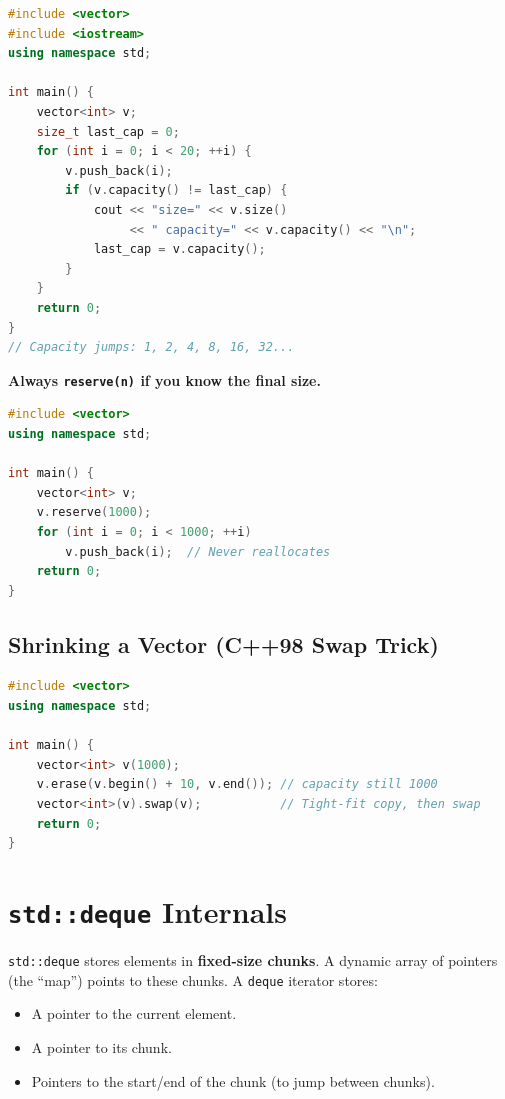 \begin{lstlisting}[language=C++, caption={Observing reallocation}]
#include <vector>
#include <iostream>
using namespace std;

int main() {
    vector<int> v;
    size_t last_cap = 0;
    for (int i = 0; i < 20; ++i) {
        v.push_back(i);
        if (v.capacity() != last_cap) {
            cout << "size=" << v.size()
                 << " capacity=" << v.capacity() << "\n";
            last_cap = v.capacity();
        }
    }
    return 0;
}
// Capacity jumps: 1, 2, 4, 8, 16, 32...
\end{lstlisting}

\textbf{Always \texttt{reserve(n)} if you know the final size.}

\begin{lstlisting}[language=C++, caption={reserve avoids reallocations}]
#include <vector>
using namespace std;

int main() {
    vector<int> v;
    v.reserve(1000);
    for (int i = 0; i < 1000; ++i)
        v.push_back(i);  // Never reallocates
    return 0;
}
\end{lstlisting}

\subsection{Shrinking a Vector (C++98 Swap Trick)}

\begin{lstlisting}[language=C++, caption={Swap trick to release excess capacity}]
#include <vector>
using namespace std;

int main() {
    vector<int> v(1000);
    v.erase(v.begin() + 10, v.end()); // capacity still 1000
    vector<int>(v).swap(v);           // Tight-fit copy, then swap
    return 0;
}
\end{lstlisting}

\section{\texttt{std::deque} Internals}
\label{sec:deque-internals}

\texttt{std::deque} stores elements in \textbf{fixed-size chunks}. A dynamic array of pointers (the ``map'') points to these chunks. A \texttt{deque} iterator stores:
\begin{itemize}
    \item A pointer to the current element.
    \item A pointer to its chunk.
    \item Pointers to the start/end of the chunk (to jump between chunks).
\end{itemize}

